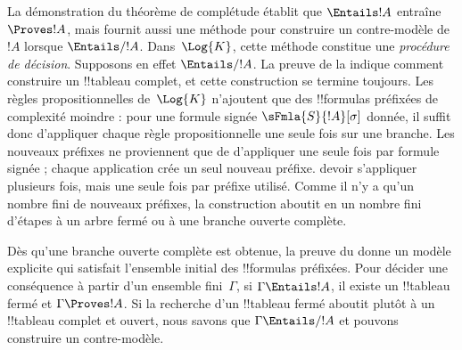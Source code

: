 \documentclass[../../../include/open-logic-section]{subfiles}
\begin{document}
      

\begin{explain}
  La démonstration du théorème de complétude établit que
  $\Entails !A$ entraîne $\Proves !A$, mais fournit aussi une méthode
  pour construire un contre-modèle de~$!A$ lorsque $\Entails/ !A$.
  Dans~$\Log{K}$, cette méthode constitue une \emph{procédure de
    décision}. Supposons en effet $\Entails/ !A$. La preuve de la
   indique comment construire un
  !!{tableau} complet, et cette construction se termine toujours.
  Les règles propositionnelles de~$\Log{K}$ n'ajoutent que des
  !!{formula}s préfixées de complexité moindre : pour une formule
  signée $\sFmla{S}{!A}[\sigma]$ donnée, il suffit donc d'appliquer
  chaque règle propositionnelle une seule fois sur une branche. Les
  nouveaux préfixes ne proviennent que de
  d'appliquer une seule fois par formule signée ; chaque application
  crée un seul nouveau préfixe.
   devoir s'appliquer
  plusieurs fois, mais une seule fois par préfixe utilisé. Comme il
  n'y a qu'un nombre fini de nouveaux préfixes, la construction
  aboutit en un nombre fini d'étapes à un arbre fermé ou à une
  branche ouverte complète.

  Dès qu'une branche ouverte complète est obtenue, la preuve du
   donne un modèle explicite qui
  satisfait l'ensemble initial des !!{formula}s préfixées. Pour décider une conséquence à partir d’un ensemble fini~$\Gamma$, si
  $\Gamma \Entails !A$, il existe un !!{tableau} fermé et
  $\Gamma \Proves !A$. Si la recherche d'un !!{tableau} fermé aboutit plutôt
  à un !!{tableau} complet et ouvert, nous savons que
  $\Gamma \Entails/ !A$ et pouvons construire un contre-modèle.
\end{explain}
\end{document}
